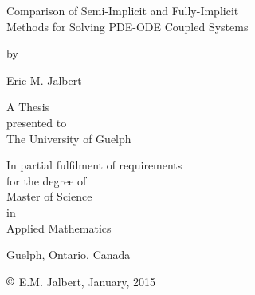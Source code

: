 \begin{titlepage}
  \begin{center}
    \vspace*{4cm}
    \LARGE{Comparison of Semi-Implicit and Fully-Implicit \\Methods for Solving PDE-ODE Coupled Systems}
    \vspace*{0.5cm}
    
    \small{by}
    \vspace*{0.5cm}
    
    \large{Eric M. Jalbert}
    \vspace*{3.5cm}
    
    A Thesis\\presented to\\The University of Guelph
    \vspace*{1.5cm}
    
    In partial fulfilment of requirements\\for the degree of\\Master of Science\\in\\Applied Mathematics
    \vfill

    Guelph, Ontario, Canada
    
    $\copyright$ E.M. Jalbert, January, 2015
  \end{center}
\end{titlepage}





